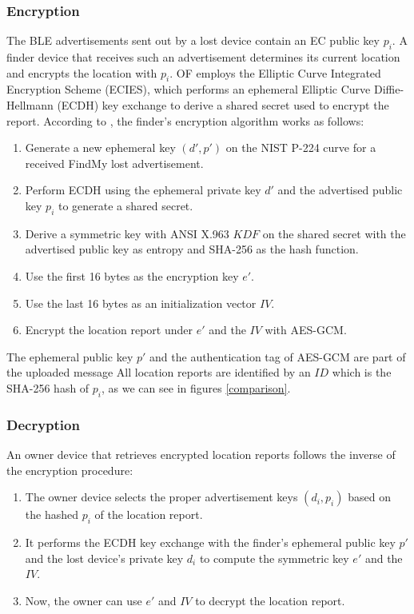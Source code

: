 \documentclass[english]{article}
\begin{document}
\subsubsection{Encryption}
The BLE advertisements sent out by a lost device contain an EC public key $p_i$. A finder
device that receives such an advertisement determines its current location and encrypts the location with $p_i$. OF employs the Elliptic Curve Integrated Encryption
Scheme (ECIES), which performs an ephemeral Elliptic Curve Diffie-Hellmann (ECDH) key exchange to derive a shared secret used to encrypt the report. According to \cite{whocanfind}, the finder’s encryption algorithm works as follows:
\begin{enumerate}
  \item Generate a new ephemeral key $(d', p')$ on the NIST P-224 curve for a received FindMy lost advertisement.
  \item Perform ECDH using the ephemeral private key $d'$ and the advertised public key $p_i$ to generate a shared secret.
  \item Derive a symmetric key with ANSI X.963 $KDF$ on the shared secret with the advertised public key as entropy and SHA-256 as the hash function.
  \item Use the first 16 bytes as the encryption key $e'$.
  \item Use the last 16 bytes as an initialization vector $IV$.
  \item Encrypt the location report under $e'$ and the $IV$ with AES-GCM. 
\end{enumerate} 
The ephemeral public key $p'$ and the authentication tag of AES-GCM are part of the uploaded message All location reports are identified by an $ID$ which is the SHA-256 hash of $p_i$, as we can see in figures \ref{comparison}.

\subsubsection{Decryption}
An owner device that retrieves encrypted location reports follows the inverse of the encryption procedure:
\begin{enumerate}
  \item The owner device selects the proper advertisement keys $(d_i, p_i)$ based on the hashed $p_i$ of the location report.
  \item It performs the ECDH key exchange with the finder’s ephemeral public key $p'$ and the lost device’s private key $d_i$ to compute the symmetric key $e'$ and the $IV$.
  \item Now, the owner can use $e'$ and $IV$ to decrypt the location report.
\end{enumerate}
\end{document}
